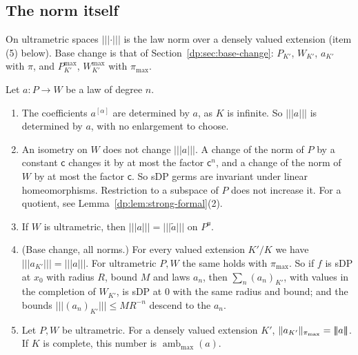 \subsection{The norm itself}\label{dp:s:ssec-norm}

On ultrametric spaces $\lvert\!\lvert\!\lvert \cdot\rvert\!\rvert\!\rvert$ is the law norm over a densely valued extension (item (5) below). Base change is that of Section~\ref{dp:sec:base-change}: $P_{K'}$, $W_{K'}$, $a_{K'}$ with $\pi$, and $P^{\max}_{K'}$, $W^{\max}_{K'}$ with $\pi_{\max}$.

\begin{proposition}\label{dp:prop:strong-intrinsic}
Let $a\colon P\to W$ be a law of degree $n$.
\begin{enumerate}
\item The coefficients $a^{[\alpha]}$ are determined by $a$, as $K$ is infinite. So $\lvert\!\lvert\!\lvert a\rvert\!\rvert\!\rvert$ is determined by $a$, with no enlargement to choose.
\item An isometry on $W$ does not change $\lvert\!\lvert\!\lvert a\rvert\!\rvert\!\rvert$. A change of the norm of $P$ by a constant $\mathsf c$ changes it by at most the factor $\mathsf c^n$, and a change of the norm of $W$ by at most the factor $\mathsf c$. So sDP germs are invariant under linear homeomorphisms. Restriction to a subspace of $P$ does not increase it. For a quotient, see Lemma~\ref{dp:lem:strong-formal}(2).
\item If $W$ is ultrametric, then $\lvert\!\lvert\!\lvert a\rvert\!\rvert\!\rvert=\lvert\!\lvert\!\lvert \tilde a\rvert\!\rvert\!\rvert$ on $P^{\mathsf u}$.
\item \textup{(Base change, all norms.)} For every valued extension $K'/K$ we have $\lvert\!\lvert\!\lvert a_{K'}\rvert\!\rvert\!\rvert=\lvert\!\lvert\!\lvert a\rvert\!\rvert\!\rvert$. For ultrametric $P,W$ the same holds with $\pi_{\max}$. So if $f$ is sDP at $x_0$ with radius $R$, bound $M$ and laws $a_n$, then $\sum_n(a_n)_{K'}$, with values in the completion of $W_{K'}$, is sDP at $0$ with the same radius and bound; and the bounds $\lvert\!\lvert\!\lvert (a_n)_{K'}\rvert\!\rvert\!\rvert\le MR^{-n}$ descend to the $a_n$.
\item Let $P,W$ be ultrametric. For a densely valued extension $K'$, $\lVert a_{K'}\rVert_{\pi_{\max}}=\lvert\!\lvert\!\lvert a\rvert\!\rvert\!\rvert$. If $K$ is complete, this number is $\operatorname{amb}_{\max}(a)$.
\end{enumerate}
\end{proposition}

